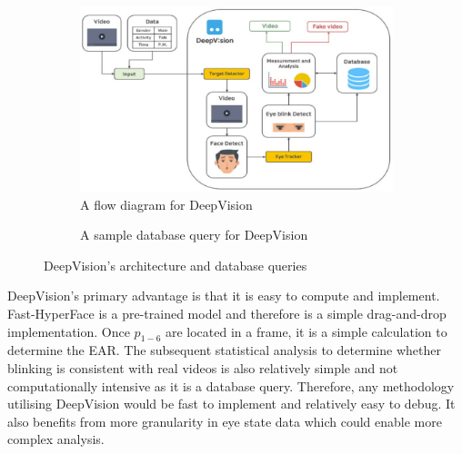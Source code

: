\begin{figure}[h]
    \centering
    \begin{subfigure}{0.45\textwidth}
        \centering
        \includegraphics[width=\linewidth]{dissertation//figures/deepvision-flow.png}
        \caption{A flow diagram for DeepVision\cite{jung2020deepvision}}
        \label{fig:deepvision-flow}
    \end{subfigure}
    \hfill
    \begin{subfigure}{0.45\textwidth}
        \centering
        \caption{A sample database query for DeepVision\cite{jung2020deepvision}}
        \label{fig:deepvision-database}
    \end{subfigure}
    \caption{DeepVision's architecture and database queries}
    \label{fig:deepvision}
\end{figure}

DeepVision's primary advantage is that it is easy to compute and implement. Fast-HyperFace is a pre-trained model and therefore is a simple drag-and-drop implementation. Once $p_{1-6}$ are located in a frame, it is a simple calculation to determine the EAR. The subsequent statistical analysis to determine whether blinking is consistent with real videos is also relatively simple and not computationally intensive as it is a database query. Therefore, any methodology utilising DeepVision would be fast to implement and relatively easy to debug. It also benefits from more granularity in eye state data which could enable more complex analysis.

